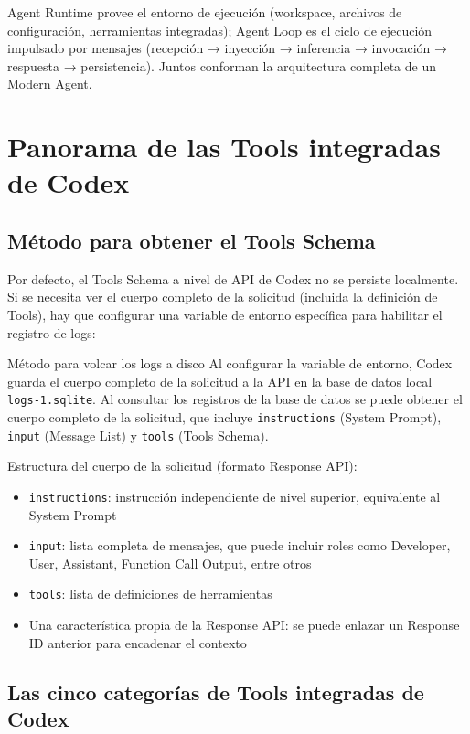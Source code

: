 \documentclass[a4paper]{article}
\begin{document}
Agent Runtime provee el entorno de ejecución (workspace, archivos de configuración, herramientas integradas); Agent Loop es el ciclo de ejecución impulsado por mensajes (recepción → inyección → inferencia → invocación → respuesta → persistencia). Juntos conforman la arquitectura completa de un Modern Agent.


\section{Panorama de las Tools integradas de Codex}

\subsection{Método para obtener el Tools Schema}

Por defecto, el Tools Schema a nivel de API de Codex no se persiste localmente. Si se necesita ver el cuerpo completo de la solicitud (incluida la definición de Tools), hay que configurar una variable de entorno específica para habilitar el registro de logs:

\begin{warningbox}{Método para volcar los logs a disco}
Al configurar la variable de entorno, Codex guarda el cuerpo completo de la solicitud a la API en la base de datos local \texttt{logs-1.sqlite}. Al consultar los registros de la base de datos se puede obtener el cuerpo completo de la solicitud, que incluye \texttt{instructions} (System Prompt), \texttt{input} (Message List) y \texttt{tools} (Tools Schema).
\end{warningbox}

Estructura del cuerpo de la solicitud (formato Response API):

\begin{itemize}
    \item \texttt{instructions}: instrucción independiente de nivel superior, equivalente al System Prompt
    \item \texttt{input}: lista completa de mensajes, que puede incluir roles como Developer, User, Assistant, Function Call Output, entre otros
    \item \texttt{tools}: lista de definiciones de herramientas
    \item Una característica propia de la Response API: se puede enlazar un Response ID anterior para encadenar el contexto
\end{itemize}

\subsection{Las cinco categorías de Tools integradas de Codex}
\end{document}
